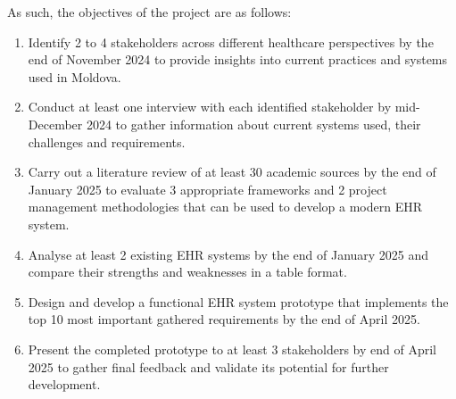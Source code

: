 As such, the objectives of the project are as follows:
\begin{enumerate}   
    \item Identify 2 to 4 stakeholders across different healthcare perspectives by the end of November 2024 to provide insights into current practices and systems used in Moldova.
    \item Conduct at least one interview with each identified stakeholder by mid-December 2024 to gather information about current systems used, their challenges and requirements.
    \item Carry out a literature review of at least 30 academic sources by the end of January 2025 to evaluate 3 appropriate frameworks and 2 project management methodologies that can be used to develop a modern EHR system.
    \item Analyse at least 2 existing EHR systems by the end of January 2025 and compare their strengths and weaknesses in a table format.
    \item Design and develop a functional EHR system prototype that implements the top 10 most important gathered requirements by the end of April 2025.
    \item Present the completed prototype to at least 3 stakeholders by end of April 2025 to gather final feedback and validate its potential for further development.
\end{enumerate}
